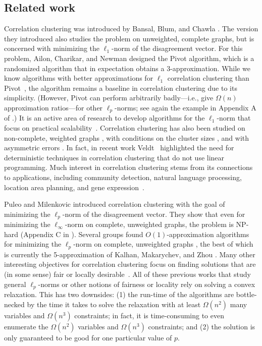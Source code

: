 \documentclass[11pt]{article}
\begin{document}
\subsection{Related work}
\label{sec:related}
Correlation clustering was introduced by 
Bansal, Blum, and Chawla \citeyearpar{BBC04}.
The version they introduced also studies the problem on unweighted, complete graphs, but is concerned with minimizing the $\ell_1$-norm of the disagreement vector.
For this problem, Ailon, Charikar, and Newman \citeyearpar{ACN-pivot} designed the Pivot algorithm, which is a randomized algorithm that in expectation obtains a 3-approximation.
While we know algorithms with better approximations for $\ell_1$ correlation clustering than Pivot~\cite{chawla2015near, cohen2022correlation}, 
the algorithm remains a baseline in correlation clustering due to its simplicity. (However, Pivot can perform arbitrarily badly---i.e., give $\Omega(n)$ approximation ratios---for other $\ell_p$-norms; see again the example in Appendix A of \cite{PM16}.)
It is an active area of research to develop algorithms for the $\ell_1$-norm that focus on practical scalability~\cite{bonchi2014, chierichetti2014, pan2014scaling, SDELM21, single-pass2023}. 
Correlation clustering has also been studied on non-complete, weighted graphs \cite{CGS17, KMZ19}, with conditions on the cluster sizes \cite{puleo2015correlation}, and with asymmetric errors \cite{JafarovKMM21}. 
In fact, in recent work Veldt~\cite{veldt2022correlation} highlighted the need for deterministic techniques in correlation clustering that do not use linear programming.
Much interest in correlation clustering stems from its connections to applications,
including community detection, natural language processing, location area planning, and gene expression~\cite{veldt2018, SDELM21, Wirth17, mccallum2004conditional, ben1999clustering, demaine2003correlation}.


Puleo and Milenkovic \citeyearpar{PM16} introduced correlation clustering
with the goal of minimizing the $\ell_p$-norm of the disagreement vector.
They show that even for minimizing the $\ell_\infty$-norm on complete, unweighted graphs, the problem is \textsf{NP}-hard (Appendix C in \cite{PM16}).
Several groups found $O(1)$-approximation algorithms for minimizing the $\ell_p$-norm on complete, unweighted graphs \cite{PM16, CGS17, KMZ19}, the best of which is currently the 5-approximation of Kalhan, Makarychev, and Zhou \citeyearpar{KMZ19}.
Many other interesting objectives for correlation clustering focus on finding solutions that are (in some sense) fair or locally desirable~\cite{ahmadian2020fair, bateni2022scalable, ahmadi2020fair, friggstad2021fair, jafarov2021local, Khuller2019min}.
All of these previous works that study general $\ell_p$-norms or other notions of fairness or locality rely on solving a convex relaxation. 
This has two downsides: (1) the run-time of the algorithms are bottle-necked by the time it takes to solve the relaxation with at least $\Omega(n^2)$ many variables and $\Omega(n^3)$ constraints; in fact, it is time-consuming to even enumerate the $\Omega(n^2)$ variables and $\Omega(n^3)$ constraints; and (2) the solution is only guaranteed to be good for one particular value of $p$. 
\end{document}

